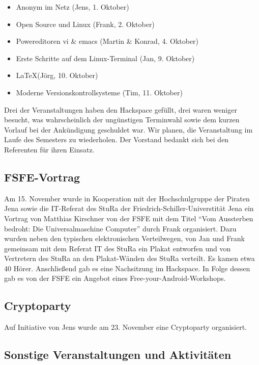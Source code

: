 \documentclass[10pt,DIV16]{scrartcl}
\begin{document}
\begin{itemize}
	\item Anonym im Netz (Jens, 1. Oktober)
	\item Open Source und Linux (Frank, 2. Oktober)
	\item Powereditoren vi \& emacs (Martin \& Konrad, 4. Oktober)
	\item Erste Schritte auf dem Linux-Terminal (Jan, 9. Oktober)
	\item \LaTeX (Jörg, 10. Oktober)
	\item Moderne Versionskontrollsysteme (Tim, 11. Oktober)
\end{itemize}

Drei der Veranstaltungen haben den Hackspace gefüllt, drei waren weniger
besucht, was wahrscheinlich der ungünstigen Terminwahl sowie dem kurzen
Vorlauf bei der Ankündigung geschuldet war.  Wir planen, die Veranstaltung im
Laufe des Semesters zu wiederholen.  Der Vorstand bedankt sich bei den
Referenten für ihren Einsatz.

\subsection{FSFE-Vortrag}

Am 15. November wurde in Kooperation mit der Hochschulgruppe der 
Piraten Jena sowie die IT-Referat des StuRa der 
Friedrich-Schiller-Universtität Jena ein Vortrag von Matthias 
Kirschner von der FSFE mit dem Titel "`Vom Aussterben bedroht: Die 
Universalmaschine Computer"' durch Frank organisiert.  Dazu wurden 
neben den typischen elektronischen Verteilwegen, von Jan und Frank 
gemeinsam mit dem Referat IT des StuRa ein Plakat entworfen und von 
Vertretern des StuRa an den Plakat-Wänden des StuRa verteilt. Es 
kamen etwa 40 Hörer. Anschließend gab es eine Nachsitzung im 
Hackspace. In Folge dessen gab es von der FSFE ein Angebot eines 
\frqq{}Free-your-Android\flqq{}-Workshops.

\subsection{Cryptoparty}

Auf Initiative von Jens wurde am 23. November eine Cryptoparty organisiert.

\subsection{Sonstige Veranstaltungen und Aktivitäten}
\end{document}
